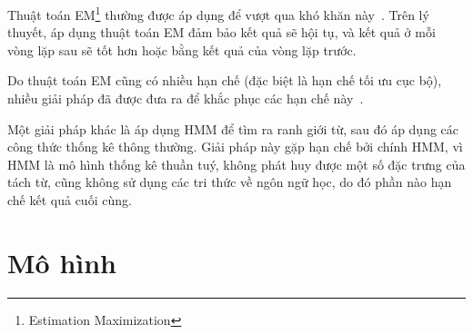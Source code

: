 \documentclass[a4paper,oneside,14pt]{extbook} %
\begin{document}
Thuật toán EM\footnote{Estimation Maximization} thường được áp dụng để vượt
qua khó khăn này~\cite{softcount,Sproat}. Trên lý thuyết, áp dụng
thuật toán EM đảm bảo kết quả sẽ hội tụ, và kết quả ở mỗi vòng lặp sau
sẽ tốt hơn hoặc bằng kết quả của vòng lặp trước. 

Do thuật toán EM cũng có nhiều hạn chế (đặc biệt là hạn chế tối ưu cục
bộ), nhiều giải pháp đã được đưa ra để khắc phục các hạn chế
này~\cite{text-tiling,self-supervised}. 

Một giải pháp khác là áp dụng HMM để tìm ra ranh giới từ, sau đó áp
dụng các công thức thống kê thông thường. Giải pháp này gặp hạn chế
bởi chính HMM, vì HMM là mô hình thống kê thuần tuý, không phát huy
được một số đặc trưng của tách từ, cũng không sử dụng các tri thức về
ngôn ngữ học, do đó phần nào hạn chế kết quả cuối cùng. 






\chapter{Mô hình}
\label{cha:model}
\minitoc
\end{document}
